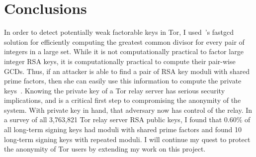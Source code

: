 \section{Conclusions}
\label{sec:conclusion}

In order to detect potentially weak factorable keys in Tor, I used~\cite{heninger2012mining}'s fastgcd solution for efficiently computing the greatest common divisor for every pair of integers in a large set. While it is not computationally practical to factor large integer RSA keys, it is computationally practical to compute their pair-wise GCDs. Thus, if an attacker is able to find a pair of RSA key moduli with shared prime factors, then she can easily use this information to compute the private keys~\cite{heninger2012mining, lenstra2012ron}. Knowing the private key of a Tor relay server has serious security implications, and is a critical first step to compromising the anonymity of the system. With private key in hand, that adversary now has control of the relay. In a survey of all 3,763,821 Tor relay server RSA public keys, I found that 0.60\% of all long-term signing keys had moduli with shared prime factors and found 10 long-term signing keys with repeated moduli. I will continue my quest to protect the anonymity of Tor users by extending my work on this project.